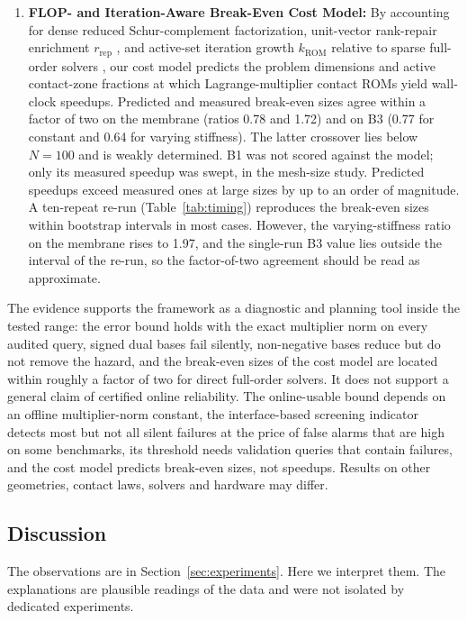 \documentclass[11pt,a4paper]{article}
\begin{document}
\begin{enumerate}
\item
  \textbf{FLOP- and Iteration-Aware Break-Even Cost Model:} By accounting for dense reduced Schur-complement factorization, unit-vector rank-repair enrichment \(r_{\text{rep}}\) \cite{leberre2022condition}, and active-set iteration growth \(k_{\text{ROM}}\) relative to sparse full-order solvers \cite{franceschini2022block, pawar2025efficient}, our cost model predicts the problem dimensions and active contact-zone fractions at which Lagrange-multiplier contact ROMs yield wall-clock speedups. Predicted and measured break-even sizes agree within a factor of two on the membrane (ratios 0.78 and 1.72) and on B3 (0.77 for constant and 0.64 for varying stiffness). The latter crossover lies below \(N = 100\) and is weakly determined. B1 was not scored against the model; only its measured speedup was swept, in the mesh-size study. Predicted speedups exceed measured ones at large sizes by up to an order of magnitude. A ten-repeat re-run (Table~\ref{tab:timing}) reproduces the break-even sizes within bootstrap intervals in most cases. However, the varying-stiffness ratio on the membrane rises to 1.97, and the single-run B3 value lies outside the interval of the re-run, so the factor-of-two agreement should be read as approximate.
\end{enumerate}

The evidence supports the framework as a diagnostic and planning tool inside the tested range: the error bound holds with the exact multiplier norm on every audited query, signed dual bases fail silently, non-negative bases reduce but do not remove the hazard, and the break-even sizes of the cost model are located within roughly a factor of two for direct full-order solvers. It does not support a general claim of certified online reliability. The online-usable bound depends on an offline multiplier-norm constant, the interface-based screening indicator detects most but not all silent failures at the price of false alarms that are high on some benchmarks, its threshold needs validation queries that contain failures, and the cost model predicts break-even sizes, not speedups. Results on other geometries, contact laws, solvers and hardware may differ.

\subsection{Discussion}\label{sec:discussion}

The observations are in Section~\ref{sec:experiments}. Here we interpret them. The explanations are plausible readings of the data and were not isolated by dedicated experiments.
\end{document}
